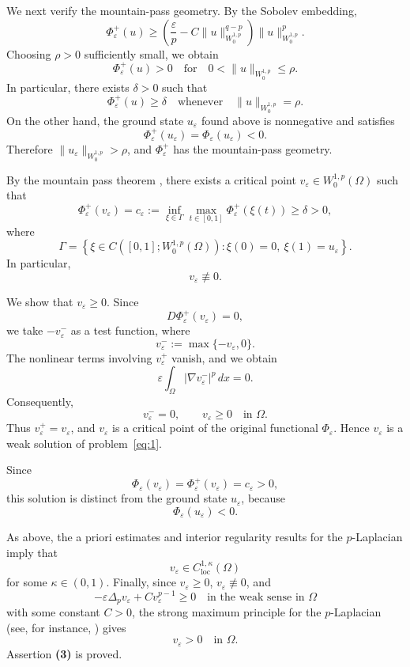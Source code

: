 \documentclass[preprint,11pt]{elsarticle}
\numberwithin{equation}{section}
\begin{document}
We next verify the mountain-pass geometry. By the Sobolev embedding,
\[
\Phi_\varepsilon^+(u)
\ge
\left(
\frac{\varepsilon}{p}
-
C\|u\|_{W^{1,p}_0}^{q-p}
\right)
\|u\|_{W^{1,p}_0}^{p}.
\]
Choosing \(\rho>0\) sufficiently small, we obtain
\[
\Phi_\varepsilon^+(u)>0
\quad\text{for}\quad
0<\|u\|_{W^{1,p}_0}\le \rho .
\]
In particular, there exists \(\delta>0\) such that
\[
\Phi_\varepsilon^+(u)\ge\delta
\quad\text{whenever}\quad
\|u\|_{W^{1,p}_0}=\rho .
\]
On the other hand, the ground state \(u_\varepsilon\) found above is
nonnegative and satisfies
\[
\Phi_\varepsilon^+(u_\varepsilon)
=
\Phi_\varepsilon(u_\varepsilon)
<0 .
\]
Therefore \(\|u_\varepsilon\|_{W^{1,p}_0}>\rho\), and
\(\Phi_\varepsilon^+\) has the mountain-pass geometry.

By the mountain pass theorem \cite{AmbrRabin}, there exists a critical point
\(v_\varepsilon\in W^{1,p}_0(\Omega)\) such that
\[
\Phi_\varepsilon^+(v_\varepsilon)
=
c_\varepsilon
:=
\inf_{\xi\in\Gamma}
\max_{t\in[0,1]}
\Phi_\varepsilon^+(\xi(t))
\ge
\delta>0,
\]
where
\[
\Gamma
=
\left\{
\xi\in C([0,1];W^{1,p}_0(\Omega)):
\xi(0)=0,\ \xi(1)=u_\varepsilon
\right\}.
\]
In particular,
\[
v_\varepsilon\not\equiv0 .
\]

We show that \(v_\varepsilon\ge0\). Since
\[
D\Phi_\varepsilon^+(v_\varepsilon)=0,
\]
we take \(-v_\varepsilon^-\) as a test function, where
\[
v_\varepsilon^-:=\max\{-v_\varepsilon,0\}.
\]
The nonlinear terms involving \(v_\varepsilon^+\) vanish, and we obtain
\[
\varepsilon
\int_\Omega |\nabla v_\varepsilon^-|^p\,dx
=
0 .
\]
Consequently,
\[
v_\varepsilon^-=0,
\qquad
v_\varepsilon\ge0
\quad\text{in }\Omega .
\]
Thus \(v_\varepsilon^+=v_\varepsilon\), and \(v_\varepsilon\) is a critical
point of the original functional \(\Phi_\varepsilon\). Hence
\(v_\varepsilon\) is a weak solution of problem~\eqref{eq:1}.

Since
\[
\Phi_\varepsilon(v_\varepsilon)
=
\Phi_\varepsilon^+(v_\varepsilon)
=
c_\varepsilon
>
0,
\]
this solution is distinct from the ground state \(u_\varepsilon\), because
\[
\Phi_\varepsilon(u_\varepsilon)<0 .
\]

As above, the a priori estimates and interior regularity results for the
\(p\)-Laplacian imply that
\[
v_\varepsilon\in C^{1,\kappa}_{\mathrm{loc}}(\Omega)
\]
for some \(\kappa\in(0,1)\). Finally, since
\(v_\varepsilon\ge0\), \(v_\varepsilon\not\equiv0\), and
\[
-\varepsilon\Delta_p v_\varepsilon
+
C v_\varepsilon^{p-1}
\ge0
\quad\text{in the weak sense in }\Omega
\]
with some constant \(C>0\), the strong maximum principle for the
\(p\)-Laplacian (see, for instance, \cite{Vazquez1984}) gives
\[
v_\varepsilon>0
\quad\text{in }\Omega .
\]
Assertion \textbf{(3)} is proved.
\end{document}
